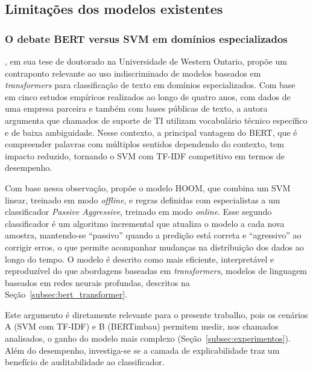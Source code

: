 \documentclass[
    12pt,                %
    openright,           %
    oneside,             %
    a4paper,             %
    english,             %
    brazil               %
]{abntex2}
\begin{document}
\subsection{Limitações dos modelos existentes}
\label{subsec:helpdesk_limitacoes}

\subsubsection{O debate BERT versus SVM em domínios especializados}
\label{subsubsec:helpdesk_debate}

, em sua tese de doutorado na Universidade de Western Ontario, propõe um contraponto relevante ao uso indiscriminado de modelos baseados em \textit{transformers} para classificação de texto em domínios especializados. Com base em cinco estudos empíricos realizados ao longo de quatro anos, com dados de uma empresa parceira e também com bases públicas de texto, a autora argumenta que chamados de suporte de TI utilizam vocabulário técnico específico e de baixa ambiguidade. Nesse contexto, a principal vantagem do BERT, que é compreender 
palavras com múltiplos sentidos dependendo do contexto, tem impacto 
reduzido, tornando o SVM com TF-IDF competitivo em termos de 
desempenho.

Com base nessa observação,  propõe o modelo HOOM, que combina um SVM linear, treinado em modo \textit{offline}, e regras definidas com especialistas a um classificador \textit{Passive Aggressive}, treinado em modo \textit{online}. Esse segundo classificador é um algoritmo incremental que atualiza o modelo a cada nova amostra, mantendo-se ``passivo'' quando a predição está correta e ``agressivo'' ao corrigir erros, o que permite acompanhar mudanças na distribuição dos dados ao longo do tempo. O modelo é descrito como mais eficiente, interpretável e reproduzível do que abordagens baseadas em \textit{transformers}, modelos de linguagem baseados em redes neurais profundas, descritos na Seção~\ref{subsec:bert_transformer}.

Este argumento é diretamente relevante para o presente trabalho, pois os cenários A (SVM com TF-IDF) e B (BERTimbau) permitem medir, nos chamados analisados, o ganho do modelo mais complexo (Seção~\ref{subsec:experimentos}). Além do desempenho, investiga-se se a camada de explicabilidade traz um benefício de auditabilidade ao classificador.
\end{document}

